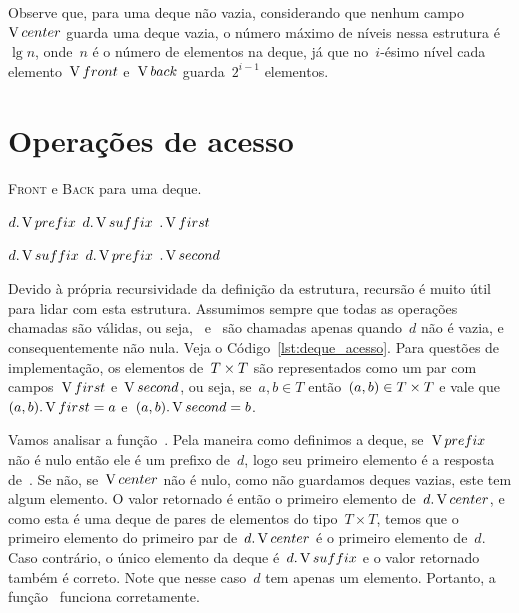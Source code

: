 \documentclass[main.tex]{subfiles}
\begin{document}
Observe que, para uma deque não vazia, considerando que nenhum campo~$\operatorname{V}{center}$ guarda uma deque vazia, o número máximo de níveis nessa estrutura é~$\lg n$, onde~$n$ é o número de elementos na deque, já que no~$i$-ésimo nível cada elemento~$\operatorname{V}{front}$ e~$\operatorname{V}{back}$ guarda~$2^{i-1}$ elementos.


\section{Operações de acesso}


\begin{algorithm}
\caption{\textsc{Front} e \textsc{Back} para uma deque.} \label{lst:deque_acesso}
\begin{algorithmic}[1]

    \State \Return \Null
\EndFunction

        \State \Return $d.\operatorname{V}{prefix}$
        \State \Return $d.\operatorname{V}{suffix}$
    \Else
        \State \Return {}$.\operatorname{V}{first}$
    \EndIf
\EndFunction

        \State \Return $d.\operatorname{V}{suffix}$
        \State \Return $d.\operatorname{V}{prefix}$
    \Else
        \State \Return {}$.\operatorname{V}{second}$
    \EndIf
\EndFunction


\end{algorithmic}
\end{algorithm}

Devido à própria recursividade da definição da estrutura, recursão é muito útil para lidar com esta estrutura.
Assumimos sempre que todas as operações chamadas são válidas, ou seja,~ e~ são chamadas apenas quando~$d$ não é vazia, e consequentemente não nula. Veja o Código~\ref{lst:deque_acesso}. Para questões de implementação, os elementos de~$T \times T$ são representados como um par com campos~$\operatorname{V}{first}$ e~$\operatorname{V}{second}$, ou seja, se~$a, b \in T$ então~$(a, b) \in T \times T$ e vale que~$(a, b).\operatorname{V}{first} = a$ e~$(a, b).\operatorname{V}{second} = b$.

Vamos analisar a função~. Pela maneira como definimos a deque, se~$\operatorname{V}{prefix}$ não é nulo então ele é um prefixo de~$d$, logo seu primeiro elemento é a resposta de~. Se não, se~$\operatorname{V}{center}$ não é nulo, como não guardamos deques vazias, este tem algum elemento. O valor retornado é então o primeiro elemento de~$d.\operatorname{V}{center}$, e como esta é uma deque de pares de elementos do tipo~$T \times T$, temos que o primeiro elemento do primeiro par de~$d.\operatorname{V}{center}$ é o primeiro elemento de~$d$. Caso contrário, o único elemento da deque é~$d.\operatorname{V}{suffix}$ e o valor retornado também é correto. Note que nesse caso~$d$ tem apenas um elemento.
Portanto, a função~ funciona corretamente.
\end{document}
